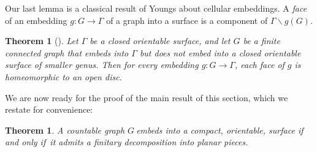 \documentclass{article}
\newcommand{\defi}[1]{{\color{darkgray}\emph{#1}}}
\newtheorem{theorem}[proposition]{Theorem}
\newcommand{\sm}{\backslash}
\newcommand{\g}{\ensuremath{G\ }}
\renewcommand{\iff}{if and only if}
\begin{document}
Our last lemma is a classical result of Youngs about cellular embeddings. A \defi{face} of an embedding $g: G \to \Gamma$ of a graph into a surface is a component of $\Gamma \sm g(G)$.

\begin{theorem}[\cite{Youngs}] \label{Youngs}
Let $\Gamma$ be a closed orientable surface, and let $G$ be a finite connected graph that embeds into $\Gamma$ but does not embed into a closed orientable surface of smaller genus. Then for every embedding $g: G \to \Gamma$, each face of $g$ is homeomorphic to an open disc. 
\end{theorem}

We are now ready for the proof of the main result of this section, which we restate for convenience:
\begin{theorem}\label{thm decomp}
A countable graph \g embeds into a compact, orientable, surface \iff\ it admits a finitary decomposition into planar pieces.
\end{theorem}
\end{document}
